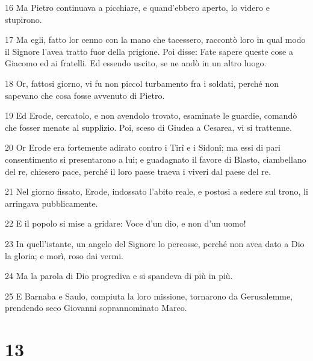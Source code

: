 \par 16 Ma Pietro continuava a picchiare, e quand'ebbero aperto, lo videro e stupirono.
\par 17 Ma egli, fatto lor cenno con la mano che tacessero, raccontò loro in qual modo il Signore l'avea tratto fuor della prigione. Poi disse: Fate sapere queste cose a Giacomo ed ai fratelli. Ed essendo uscito, se ne andò in un altro luogo.
\par 18 Or, fattosi giorno, vi fu non piccol turbamento fra i soldati, perché non sapevano che cosa fosse avvenuto di Pietro.
\par 19 Ed Erode, cercatolo, e non avendolo trovato, esaminate le guardie, comandò che fosser menate al supplizio. Poi, sceso di Giudea a Cesarea, vi si trattenne.
\par 20 Or Erode era fortemente adirato contro i Tirî e i Sidonî; ma essi di pari consentimento si presentarono a lui; e guadagnato il favore di Blasto, ciambellano del re, chiesero pace, perché il loro paese traeva i viveri dal paese del re.
\par 21 Nel giorno fissato, Erode, indossato l'abito reale, e postosi a sedere sul trono, li arringava pubblicamente.
\par 22 E il popolo si mise a gridare: Voce d'un dio, e non d'un uomo!
\par 23 In quell'istante, un angelo del Signore lo percosse, perché non avea dato a Dio la gloria; e morì, roso dai vermi.
\par 24 Ma la parola di Dio progrediva e si spandeva di più in più.
\par 25 E Barnaba e Saulo, compiuta la loro missione, tornarono da Gerusalemme, prendendo seco Giovanni soprannominato Marco.

\chapter{13}


